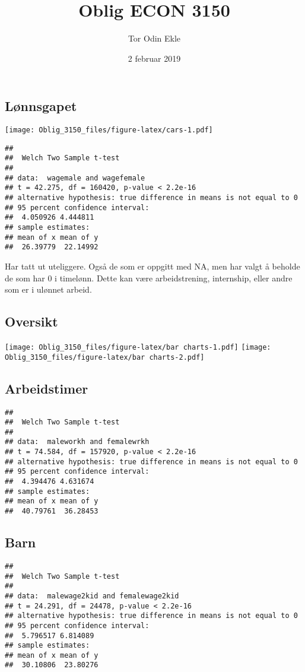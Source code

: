 \documentclass[]{article}
\title{Oblig ECON 3150}
\author{Tor Odin Ekle}
\date{2 februar 2019}
\begin{document}
\maketitle

\subsection{Lønnsgapet}\label{lnnsgapet}

\texttt{[image: Oblig\_3150\_files/figure-latex/cars-1.pdf]}

\begin{verbatim}
## 
##  Welch Two Sample t-test
## 
## data:  wagemale and wagefemale
## t = 42.275, df = 160420, p-value < 2.2e-16
## alternative hypothesis: true difference in means is not equal to 0
## 95 percent confidence interval:
##  4.050926 4.444811
## sample estimates:
## mean of x mean of y 
##  26.39779  22.14992
\end{verbatim}

Har tatt ut uteliggere. Også de som er oppgitt med NA, men har valgt å
beholde de som har 0 i timelønn. Dette kan være arbeidstrening,
internship, eller andre som er i ulønnet arbeid.

\subsection{Oversikt}\label{oversikt}

\texttt{[image: Oblig\_3150\_files/figure-latex/bar charts-1.pdf]}
\texttt{[image: Oblig\_3150\_files/figure-latex/bar charts-2.pdf]}

\subsection{Arbeidstimer}\label{arbeidstimer}

\begin{verbatim}
## 
##  Welch Two Sample t-test
## 
## data:  maleworkh and femalewrkh
## t = 74.584, df = 157920, p-value < 2.2e-16
## alternative hypothesis: true difference in means is not equal to 0
## 95 percent confidence interval:
##  4.394476 4.631674
## sample estimates:
## mean of x mean of y 
##  40.79761  36.28453
\end{verbatim}

\subsection{Barn}\label{barn}

\begin{verbatim}
## 
##  Welch Two Sample t-test
## 
## data:  malewage2kid and femalewage2kid
## t = 24.291, df = 24478, p-value < 2.2e-16
## alternative hypothesis: true difference in means is not equal to 0
## 95 percent confidence interval:
##  5.796517 6.814089
## sample estimates:
## mean of x mean of y 
##  30.10806  23.80276
\end{verbatim}
\end{document}
